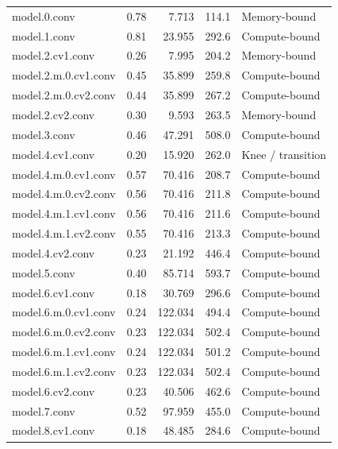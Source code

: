 \documentclass[12pt,a4paper]{report}
\begin{document}
\begin{longtable}{p{} r r r p{}}
model.0.conv                         & 0.78 & 7.713   & 114.1 & Memory-bound \\
model.1.conv                         & 0.81 & 23.955  & 292.6 & Compute-bound \\
model.2.cv1.conv                     & 0.26 & 7.995   & 204.2 & Memory-bound \\
model.2.m.0.cv1.conv                 & 0.45 & 35.899  & 259.8 & Compute-bound \\
model.2.m.0.cv2.conv                 & 0.44 & 35.899  & 267.2 & Compute-bound \\
model.2.cv2.conv                     & 0.30 & 9.593   & 263.5 & Memory-bound \\
model.3.conv                         & 0.46 & 47.291  & 508.0 & Compute-bound \\
model.4.cv1.conv                     & 0.20 & 15.920  & 262.0 & Knee / transition \\
model.4.m.0.cv1.conv                 & 0.57 & 70.416  & 208.7 & Compute-bound \\
model.4.m.0.cv2.conv                 & 0.56 & 70.416  & 211.8 & Compute-bound \\
model.4.m.1.cv1.conv                 & 0.56 & 70.416  & 211.6 & Compute-bound \\
model.4.m.1.cv2.conv                 & 0.55 & 70.416  & 213.3 & Compute-bound \\
model.4.cv2.conv                     & 0.23 & 21.192  & 446.4 & Compute-bound \\
model.5.conv                         & 0.40 & 85.714  & 593.7 & Compute-bound \\
model.6.cv1.conv                     & 0.18 & 30.769  & 296.6 & Compute-bound \\
model.6.m.0.cv1.conv                 & 0.24 & 122.034 & 494.4 & Compute-bound \\
model.6.m.0.cv2.conv                 & 0.23 & 122.034 & 502.4 & Compute-bound \\
model.6.m.1.cv1.conv                 & 0.24 & 122.034 & 501.2 & Compute-bound \\
model.6.m.1.cv2.conv                 & 0.23 & 122.034 & 502.4 & Compute-bound \\
model.6.cv2.conv                     & 0.23 & 40.506  & 462.6 & Compute-bound \\
model.7.conv                         & 0.52 & 97.959  & 455.0 & Compute-bound \\
model.8.cv1.conv                     & 0.18 & 48.485  & 284.6 & Compute-bound \\

\end{longtable}
\end{document}
